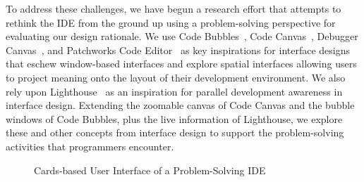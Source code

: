 \documentclass{ppig}
\begin{document}
To address these challenges, we have begun a research effort that attempts to rethink the IDE from the ground up using a problem-solving perspective for evaluating our design rationale.
We use Code Bubbles~\cite{bragdon2010bubbles}, Code Canvas~\cite{deline2010canvas}, Debugger Canvas~\cite{deline2012debugger}, and Patchworks Code Editor~\cite{henley2014patchworks} as key inspirations for interface designs that eschew window-based interfaces and explore spatial interfaces allowing users to project meaning onto the layout of their development environment.
We also rely upon Lighthouse~\cite{dasilva2006lighthouse} as an inspiration for parallel development awareness in interface design.
Extending the zoomable canvas of Code Canvas and the bubble windows of Code Bubbles, plus the live information of Lighthouse, we explore these and other concepts from interface design to support the problem-solving activities that programmers encounter.

\begin{figure}[h!]
	\caption{Cards-based User Interface of a Problem-Solving IDE}
	\label{mockup}
	\vspace*{-1.5\baselineskip}
\end{figure}
\end{document}
